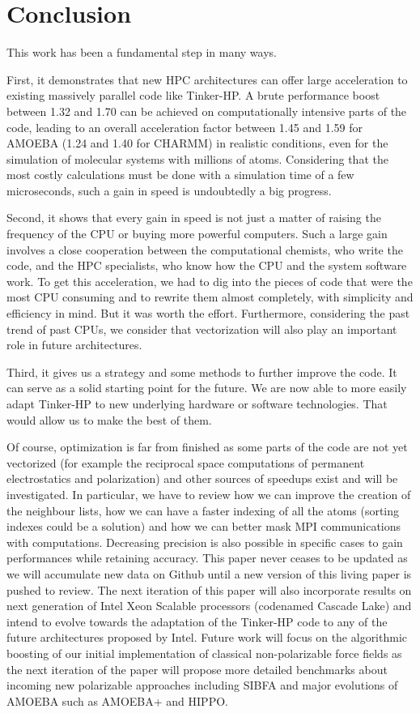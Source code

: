 \documentclass[9pt,comparison]{livecoms}
\begin{document}
\section{Conclusion}
\hspace{\parindent}This work has been a fundamental step in many ways.

First, it demonstrates that new HPC architectures can offer large acceleration to existing massively parallel code like Tinker-HP. A brute  performance boost between 1.32 and 1.70 can be achieved on computationally intensive parts of the code, leading to an overall acceleration factor between 1.45 and 1.59 for AMOEBA (1.24 and 1.40 for CHARMM) in realistic conditions, even for the simulation of  molecular systems with millions of atoms. Considering that the most costly calculations must be done with a simulation time of a few microseconds, such a gain in speed is undoubtedly a big progress.

Second, it shows that every gain in speed is not just a matter of raising the frequency of the CPU or buying more powerful computers. Such a large gain involves a close cooperation between the computational chemists, who write the code, and the HPC specialists, who know how the CPU and the system software work. To get this acceleration, we had to dig into the pieces of code that were the most CPU consuming and to rewrite them almost completely, with simplicity and efficiency in mind. But it was worth the effort. Furthermore, considering the past trend of past CPUs, we consider that vectorization will also play an important role in future architectures.

Third, it gives us a strategy and some methods to further improve the code. It can serve as a solid starting point for the future. We are now able to more easily adapt Tinker-HP to new underlying hardware or software technologies. That would allow us to make the best of them.

Of course, optimization is far from finished as some parts of the code are not yet vectorized (for example the reciprocal space computations of permanent electrostatics and polarization) and other sources of speedups exist and will be investigated. In particular, we have to review how we can improve the creation of the neighbour lists, how we can have a faster indexing of all the atoms (sorting indexes could be a solution) and how we can better mask MPI communications with computations.  Decreasing precision is also possible in specific cases to gain performances while retaining accuracy. This paper never ceases to be updated as we will accumulate new data on Github until a new version of this living paper is pushed to review. The next iteration of this paper will also incorporate  results on next generation of Intel Xeon Scalable processors (codenamed Cascade Lake) and intend to evolve towards the adaptation of the Tinker-HP code to any of the future architectures proposed by Intel. Future work will focus on the algorithmic boosting of our initial implementation of classical non-polarizable force fields as the next iteration of the paper will propose more detailed benchmarks about incoming new polarizable approaches including SIBFA \cite{gresh2007anisotropic,SIBFAjpp} and major evolutions of AMOEBA such as AMOEBA+\cite{AMOEBA+} and HIPPO\cite{electrohippo,hippoexchange}. 
\end{document}
